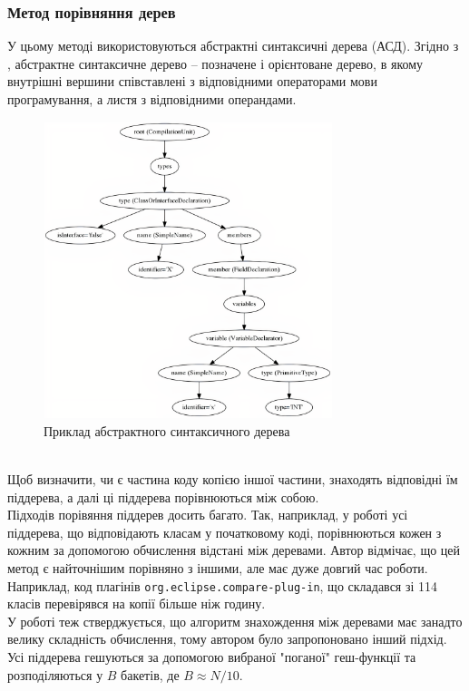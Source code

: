 \documentclass[a4paper, 14pt]{article}
\begin{document}
\subsubsection{Метод порівняння дерев}
У цьому методі використовуються абстрактні синтаксичні дерева (АСД). Згідно з \cite{wiki:ast}, абстрактне синтаксичне дерево -- позначене і орієнтоване дерево, в якому внутрішні вершини співставлені з відповідними операторами мови програмування, а листя з відповідними операндами.
\begin{figure}[h!]
    \centering
    \includegraphics[width=0.75\textwidth]{ast-example}
    \caption{Приклад абстрактного синтаксичного дерева \cite{ast-example}}
    \label{fig:pdg-example}
\end{figure}\\
Щоб визначити, чи є частина коду копією іншої частини, знаходять відповідні їм піддерева, а далі ці піддерева порівнюються між собою. \\
Підходів порівяння піддерев досить багато. Так, наприклад, у роботі \cite{Sager06} усі піддерева, що відповідають класам у початковому коді, порівнюються кожен з кожним за допомогою обчислення відстані між деревами. Автор відмічає, що цей метод є найточнішим порівняно з іншими, але має дуже довгий час роботи. Наприклад, код плагінів \verb|org.eclipse.compare-plug-in|, що складався зі 114 класів перевірявся на копії більше ніж годину. \\
У роботі \cite{Baxter98} теж стверджується, що алгоритм знахождення між деревами має занадто велику складність обчислення, тому автором було запропоновано інший підхід. Усі піддерева гешуються за допомогою вибраної "поганої" геш-функції та розподіляються у $B$ бакетів, де $B \approx N/10$. 
\end{document}
